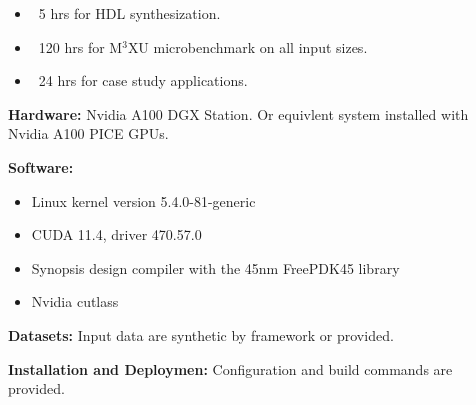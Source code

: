 \documentclass[conference]{IEEEtran}
\newcommand{\MPCMXU}[1]{M$^{3}$XU}
\begin{document}

\arttime
\begin{itemize}
    \item ~5 hrs for HDL synthesization.
    \item ~120 hrs for \MPCMXU{} microbenchmark on all input sizes.
    \item ~24 hrs for case study applications.
\end{itemize}



\artin
\noindent\textbf{Hardware:} Nvidia A100 DGX Station. Or equivlent system installed with Nvidia A100 PICE GPUs.

\noindent\textbf{Software:}
\begin{itemize}
    \item Linux kernel version 5.4.0-81-generic
    \item CUDA 11.4, driver 470.57.0
    \item Synopsis design compiler with the 45nm FreePDK45 library
    \item Nvidia cutlass
\end{itemize}

\noindent\textbf{Datasets:} Input data are synthetic by framework or provided. 

\noindent\textbf{Installation and Deploymen:} Configuration and build commands are provided.
\end{document}
